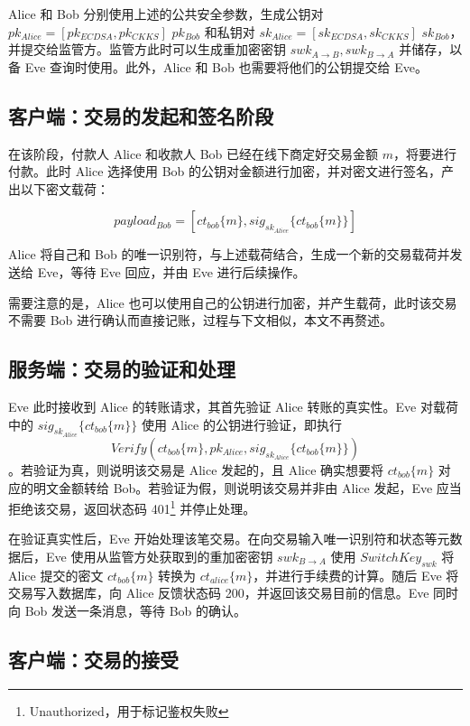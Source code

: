 Alice 和 Bob 分别使用上述的公共安全参数，生成公钥对 $pk_{Alice} = [pk_{ECDSA}, pk_{CKKS}]$ $pk_{Bob}$ 和私钥对 $sk_{Alice} = [sk_{ECDSA}, sk_{CKKS}]$ $sk_{Bob}$，并提交给监管方。监管方此时可以生成重加密密钥 $swk_{A \rightarrow B}, swk_{B \rightarrow A}$ 并储存，以备 Eve 查询时使用。此外，Alice 和 Bob 也需要将他们的公钥提交给 Eve。

\subsection{客户端：交易的发起和签名阶段}

在该阶段，付款人 Alice 和收款人 Bob 已经在线下商定好交易金额 $m$，将要进行付款。此时 Alice 选择使用 Bob 的公钥对金额进行加密，并对密文进行签名，产出以下密文载荷：

$$payload_{Bob} = [ct_{bob}\{m\}, sig_{sk_{Alice}}\{ct_{bob}\{m\}\}]$$

Alice 将自己和 Bob 的唯一识别符，与上述载荷结合，生成一个新的交易载荷并发送给 Eve，等待 Eve 回应，并由 Eve 进行后续操作。

需要注意的是，Alice 也可以使用自己的公钥进行加密，并产生载荷，此时该交易不需要 Bob 进行确认而直接记账，过程与下文相似，本文不再赘述。

\subsection{服务端：交易的验证和处理}

Eve 此时接收到 Alice 的转账请求，其首先验证 Alice 转账的真实性。Eve 对载荷中的 $sig_{sk_{Alice}}\{ct_{bob}\{m\}\}$ 使用 Alice 的公钥进行验证，即执行 $$Verify(ct_{bob}\{m\}, pk_{Alice}, sig_{sk_{Alice}}\{ct_{bob}\{m\}\})$$。若验证为真，则说明该交易是 Alice 发起的，且 Alice 确实想要将 $ct_{bob}\{m\}$  对应的明文金额转给 Bob。若验证为假，则说明该交易并非由 Alice 发起，Eve 应当拒绝该交易，返回状态码 401\footnote{Unauthorized，用于标记鉴权失败} 并停止处理。

在验证真实性后，Eve 开始处理该笔交易。在向交易输入唯一识别符和状态等元数据后，Eve 使用从监管方处获取到的重加密密钥 $swk_{B \rightarrow A}$ 使用 $SwitchKey_{swk}$ 将 Alice 提交的密文 $ct_{bob}\{m\}$ 转换为 $ct_{alice}\{m\}$，并进行手续费的计算。随后 Eve 将交易写入数据库，向 Alice 反馈状态码 200，并返回该交易目前的信息。Eve 同时向 Bob 发送一条消息，等待 Bob 的确认。

\subsection{客户端：交易的接受}

